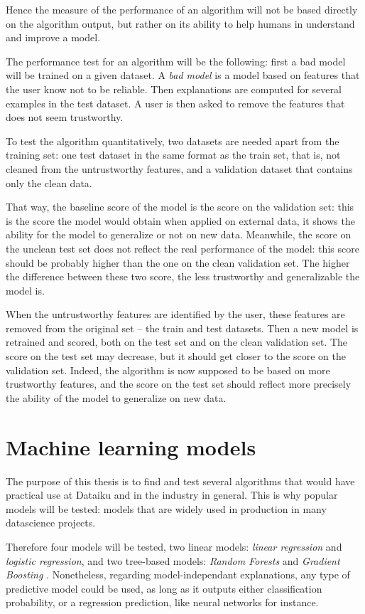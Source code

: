 \documentclass[a4paper,11pt]{kth-mag}
\begin{document}
Hence the measure of the performance of an algorithm will not be based directly on the algorithm output, but rather on its ability to help humans in understand and improve a model.

The performance test for an algorithm will be the following: first a bad model will be trained on a given dataset. A \textit{bad model} is a model based on features that the user know not to be reliable. Then explanations are computed for several examples in the test dataset. A user is then asked to remove the features that does not seem trustworthy.

To test the algorithm quantitatively, two datasets are needed apart from the training set: one test dataset in the same format as the train set, that is, not cleaned from the untrustworthy features, and a validation dataset that contains only the clean data.

That way, the baseline score of the model is the score on the validation set: this is the score the model would obtain when applied on external data, it shows the ability for the model to generalize or not on new data. Meanwhile, the score on the unclean test set does not reflect the real performance of the model: this score should be probably higher than the one on the clean validation set. The higher the difference between these two score, the less trustworthy and generalizable the model is.

When the untrustworthy features are identified by the user, these features are removed from the original set -- the train and test datasets. Then a new model is retrained and scored, both on the test set and on the clean validation set. The score on the test set may decrease, but it should get closer to the score on the validation set. Indeed, the algorithm is now supposed to be based on more trustworthy features, and the score on the test set should reflect more precisely the ability of the model to generalize on new data.

\section{Machine learning models}

The purpose of this thesis is to find and test several algorithms that would have practical use at Dataiku and in the industry in general. This is why popular models will be tested: models that are widely used in production in many datascience projects.

Therefore four models will be tested, two linear models: \textit{linear regression} and \textit{logistic regression}, and two tree-based models: \textit{Random Forests} \cite{Breiman2001} and \textit{Gradient Boosting} \cite{Friedman2001}. Nonetheless, regarding model-independant explanations, any type of predictive model could be used, as long as it outputs either classification probability, or a regression prediction, like neural networks for instance.
\end{document}

